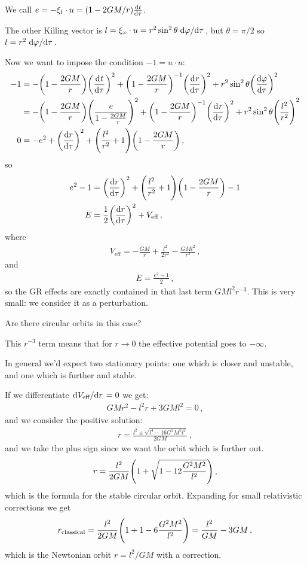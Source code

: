 \documentclass[main.tex]{subfiles}
\begin{document}
We call \(e = - \xi_t \cdot u = (1 - 2GM/r) \dv{t}{\tau }\).

The other Killing vector is \(l = \xi_\varphi \cdot u  =  r^2 \sin^2 \theta \dv*{\varphi }{\tau }\), but \(\theta = \pi /2\) so \(l = r^2 \dv*{\varphi }{\tau }\). 

Now we want to impose the condition \(-1 = u \cdot u\): 
%
\begin{align}
  -1 &=
  - \qty(1 - \frac{2GM}{r}) \qty(\dv[]{t}{\tau })^2
  + \qty(1 - \frac{2GM}{r})^{-1} \qty(\dv[]{r}{\tau })^2
  + r^2 \sin^2 \theta \qty(\dv{\varphi }{\tau })^2  \\
  &=
  - \qty(1 - \frac{2GM}{r}) \qty(\frac{e}{1 - \frac{2GM}{r}})^2
  + \qty(1 - \frac{2GM}{r})^{-1} \qty(\dv[]{r}{\tau })^2
  + r^2 \sin^2 \theta \qty(\frac{l^2}{r^2})^2  \\
  0&= - e^2 + \qty(\dv{r}{\tau })^2
  + \qty(\frac{l^2}{r^2}+1) \qty(1 - \frac{2GM}{r})
\,,
\end{align}
%
so 
%
\begin{align}
  e^2-1 &= \qty(\dv{r}{\tau })^2 + \qty(\frac{l^2}{r^2} +1)
  \qty(1 - \frac{2GM}{r}) - 1 \\
  E &=  \frac{1}{2} \qty(\dv{r}{\tau })^2
  + V _{\text{eff}}
\,,
\end{align}
%
where 
%
\begin{align}
  V_{\text{eff}} = - \frac{GM}{r} + \frac{l^2}{2 r^2} - \frac{GMl^2}{r^3}
\,,
\end{align}
%
and 
%
\begin{align}
  E = \frac{e^2-1}{2}
\,,
\end{align}
%
so the GR effects are exactly contained in that last term \(GMl^2r^{-3}\). This is very small: we consider it as a perturbation.

Are there circular orbits in this case? 

This \(r^{-3}\) term means that for \(r \rightarrow 0\) the effective potential goes to \(- \infty\).

In general we'd expect two stationary points: one which is closer and unstable, and one which is further and stable.

If we differentiate \(\dv*{V _{\text{eff}}}{r}= 0\) we get: 
%
\begin{align}
  GM r^2 - l^2 r + 3GM l^2 = 0
\,,
\end{align}
%
and we consider the positive solution: 
%
\begin{align}
  r= \frac{l^2 \pm \sqrt{l^4 - 16 G^2M^2l^2}}{2GM}
\,,
\end{align}
%
and we take the plus sign since we want the orbit which is further out. 
%
\begin{align}
  r = \frac{l^2}{2GM} \qty(1 + \sqrt{1 - 12 \frac{G^2M^2}{l^2}})
\,,
\end{align}
%
which is the formula for the stable circular orbit.
Expanding for small relativistic corrections we get 
%
\begin{align}
  r _{\text{classical}} = \frac{l^2}{2GM} \qty(1+1-6 \frac{G^2M^2}{l^2}) = \frac{l^2}{GM} - 3GM
\,,
\end{align}
%
which is the Newtonian orbit \(r = l^2/GM\) with a correction.
\end{document}
